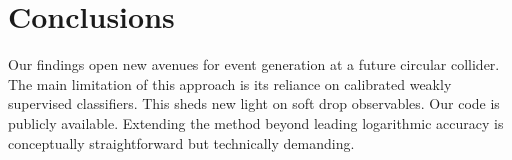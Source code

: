 \section{Conclusions}\label{sec:conclusions}

Our findings open new avenues for event generation at a future circular
collider. The main limitation of this approach is its reliance on
calibrated weakly supervised classifiers. This sheds new light on soft
drop observables. Our code is publicly available. Extending the method
beyond leading logarithmic accuracy is conceptually straightforward but
technically demanding.


